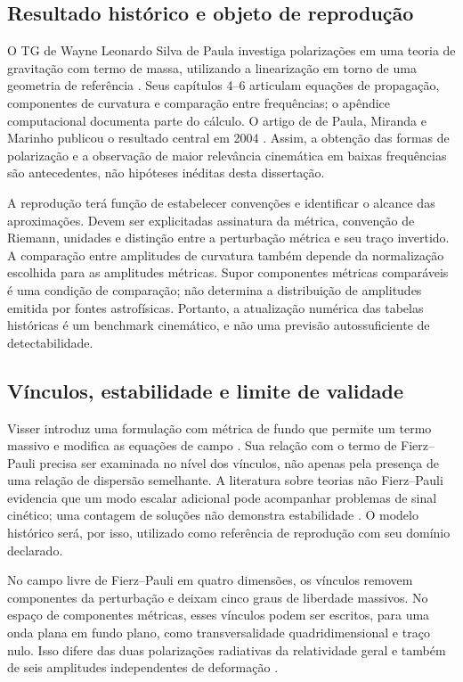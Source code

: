 \subsection{Resultado histórico e objeto de reprodução}

O TG de Wayne Leonardo Silva de Paula investiga polarizações em uma
teoria de gravitação com termo de massa, utilizando a linearização em
torno de uma geometria de referência \autocite{tg2003}. Seus capítulos
4--6 articulam equações de propagação, componentes de curvatura e
comparação entre frequências; o apêndice computacional documenta parte
do cálculo. O artigo de de Paula, Miranda e Marinho publicou o resultado
central em 2004 \autocite{depaula2004}. Assim, a obtenção das formas de
polarização e a observação de maior relevância cinemática em baixas
frequências são antecedentes, não hipóteses inéditas desta dissertação.

A reprodução terá função de estabelecer convenções e identificar o
alcance das aproximações. Devem ser explicitadas assinatura da métrica,
convenção de Riemann, unidades e distinção entre a perturbação métrica e
seu traço invertido. A comparação entre amplitudes de curvatura também
depende da normalização escolhida para as amplitudes métricas. Supor
componentes métricas comparáveis é uma condição de comparação; não
determina a distribuição de amplitudes emitida por fontes astrofísicas.
Portanto, a atualização numérica das tabelas históricas é um benchmark
cinemático, e não uma previsão autossuficiente de detectabilidade.

\subsection{Vínculos, estabilidade e limite de validade}

Visser introduz uma formulação com métrica de fundo que permite um
termo massivo e modifica as equações de campo
\autocite{visser1998}. Sua relação com o termo de Fierz--Pauli precisa
ser examinada no nível dos vínculos, não apenas pela presença de uma
relação de dispersão semelhante. A literatura sobre teorias não
Fierz--Pauli evidencia que um modo escalar adicional pode acompanhar
problemas de sinal cinético; uma contagem de soluções não demonstra
estabilidade \autocite{park2010}. O modelo histórico será, por isso,
utilizado como referência de reprodução com seu domínio declarado.

No campo livre de Fierz--Pauli em quatro dimensões, os vínculos removem
componentes da perturbação e deixam cinco graus de liberdade massivos.
No espaço de componentes métricas, esses vínculos podem ser escritos,
para uma onda plana em fundo plano, como transversalidade
quadridimensional e traço nulo. Isso difere das duas polarizações
radiativas da relatividade geral e também de seis amplitudes
independentes de deformação \autocite{liang2021,bernardo2024}.

